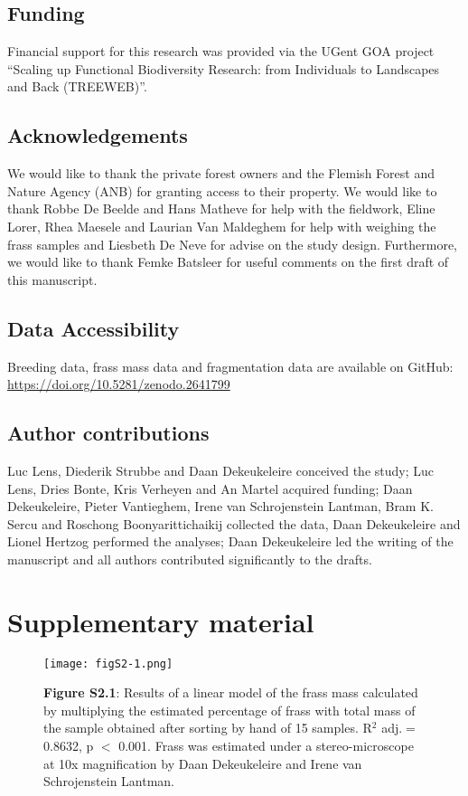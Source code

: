 \documentclass[10pt, twoside]{book} %
\begin{document}
	\clearpage
	\subsection*{Funding}
	
	Financial support for this research was provided via the UGent GOA project ``Scaling up Functional Biodiversity Research: from Individuals to Landscapes and Back (TREEWEB)''.
	
	\subsection*{Acknowledgements}
	
	We would like to thank the private forest owners and the Flemish Forest and Nature Agency (ANB) for granting access to their property. We would like to thank Robbe De Beelde and Hans Matheve for help with the fieldwork, Eline Lorer, Rhea Maesele and Laurian Van Maldeghem for help with weighing the frass samples and Liesbeth De Neve for advise on the study design. Furthermore, we would like to thank Femke Batsleer for useful comments on the first draft of this manuscript.
	
	\subsection*{Data Accessibility}
	
	Breeding data, frass mass data and fragmentation data are available on GitHub: \url{https://doi.org/10.5281/zenodo.2641799}
	
	\subsection*{Author contributions}
	Luc Lens, Diederik Strubbe and Daan Dekeukeleire conceived the study; Luc Lens, Dries Bonte, Kris Verheyen and An Martel acquired funding; Daan Dekeukeleire, Pieter Vantieghem, Irene van Schrojenstein Lantman, Bram K. Sercu and Roschong Boonyarittichaikij collected the data, Daan Dekeukeleire and Lionel Hertzog performed the analyses; Daan Dekeukeleire led the writing of the manuscript and all authors contributed significantly to the drafts.\\
	
	\clearpage
	\section{Supplementary material}
	
\begin{figure}[th]
	\begin{center}
		\texttt{[image: figS2-1.png]}
	\end{center}
	\caption*{\textbf{Figure S2.1}: Results of a linear model of the frass mass calculated by multiplying the estimated percentage of frass with total mass of the sample obtained after sorting by hand of 15 samples. R$^2$ adj.$=$ 0.8632, p $<$ 0.001. Frass was estimated under a stereo-microscope at 10x magnification by Daan Dekeukeleire and Irene van Schrojenstein Lantman.}
\end{figure}	
	
\end{document}
